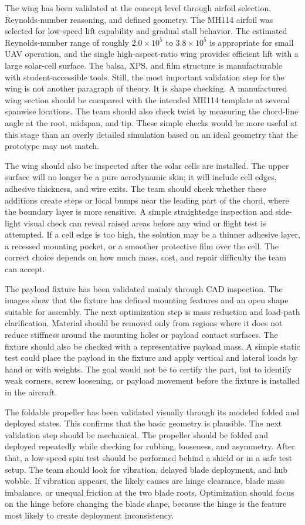 The wing has been validated at the concept level through airfoil selection, Reynolds-number reasoning, and defined geometry. The MH114 airfoil was selected for low-speed lift capability and gradual stall behavior. The estimated Reynolds-number range of roughly \(2.0 \times 10^5\) to \(3.8 \times 10^5\) is appropriate for small UAV operation, and the single high-aspect-ratio wing provides efficient lift with a large solar-cell surface. The balsa, XPS, and film structure is manufacturable with student-accessible tools. Still, the most important validation step for the wing is not another paragraph of theory. It is shape checking. A manufactured wing section should be compared with the intended MH114 template at several spanwise locations. The team should also check twist by measuring the chord-line angle at the root, midspan, and tip. These simple checks would be more useful at this stage than an overly detailed simulation based on an ideal geometry that the prototype may not match.

The wing should also be inspected after the solar cells are installed. The upper surface will no longer be a pure aerodynamic skin; it will include cell edges, adhesive thickness, and wire exits. The team should check whether these additions create steps or local bumps near the leading part of the chord, where the boundary layer is more sensitive. A simple straightedge inspection and side-light visual check can reveal raised areas before any wind or flight test is attempted. If a cell edge is too high, the solution may be a thinner adhesive layer, a recessed mounting pocket, or a smoother protective film over the cell. The correct choice depends on how much mass, cost, and repair difficulty the team can accept.

The payload fixture has been validated mainly through CAD inspection. The images show that the fixture has defined mounting features and an open shape suitable for assembly. The next optimization step is mass reduction and load-path clarification. Material should be removed only from regions where it does not reduce stiffness around the mounting holes or payload contact surfaces. The fixture should also be checked with a representative payload mass. A simple static test could place the payload in the fixture and apply vertical and lateral loads by hand or with weights. The goal would not be to certify the part, but to identify weak corners, screw loosening, or payload movement before the fixture is installed in the aircraft.

The foldable propeller has been validated visually through its modeled folded and deployed states. This confirms that the basic geometry is plausible. The next validation step should be mechanical. The propeller should be folded and deployed repeatedly while checking for rubbing, looseness, and asymmetry. After that, a low-speed spin test should be performed behind a shield or in a safe test setup. The team should look for vibration, delayed blade deployment, and hub wobble. If vibration appears, the likely causes are hinge clearance, blade mass imbalance, or unequal friction at the two blade roots. Optimization should focus on the hinge before changing the blade shape, because the hinge is the feature most likely to create deployment inconsistency.

